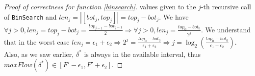 \begin{proof}[Proof of correctness for function \ref{binsearch}]
   values given to the $j$-th recursive call of \texttt{BinSearch} and $len_j =|[bot_j, top_j]| = top_j - bot_j$. We have
   $\forall j > 0, len_j = top_j - bot_j = \frac{top_{j-1} - bot_{j-1}}{2} \Rightarrow \forall j >0, len_j =
   \frac{top_0 - bot_0}{2^j}$. We understand that in the worst case $len_j = \epsilon_1 + \epsilon_2 \Rightarrow
   2^j = \frac{top_0-bot_0}{\epsilon_1 + \epsilon_2} \Rightarrow j = \log_2(\frac{top_0-bot_0}{\epsilon_1+\epsilon_2})$.
   Also, as we saw earlier, $\delta^*$ is always in the available interval, thus $maxFlow(\delta^*) \in [F' - \epsilon_1,
   F' + \epsilon_2]$.
\end{proof}
